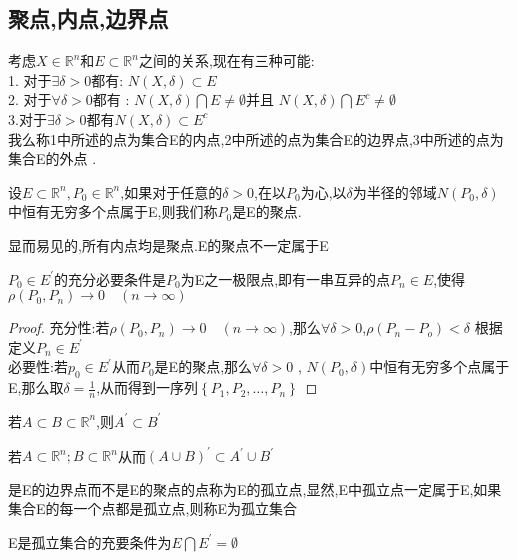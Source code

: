 \subsection{聚点,内点,边界点}
考虑\(X \in \mathbb{R}^{n}\)和\(E \subset \mathbb{R}^n\)之间的关系,现在有三种可能: \\ 
1. 对于\(\exists \delta > 0 \)都有: \(N(X , \delta) \subset E\) \\ 
2. 对于\(\forall \delta > 0\)都有 : \(N(X ,\delta) \bigcap E \neq \emptyset\)并且 \(N(X, \delta) \bigcap E^{c} \neq \emptyset\) \\
3.对于\(\exists \delta > 0 \)都有\(N(X,\delta) \subset E^{c}\) \\
我么称1中所述的点为集合E的内点,2中所述的点为集合E的边界点,3中所述的点为集合E的外点 . 
\begin{Definition}
    设\(E \subset \mathbb{R}^{n} , P_0 \in \mathbb{R}^n\),如果对于任意的\(\delta > 0\),在以\(P_0\)为心,以\(\delta\)为半径的邻域\(N (P_0 , \delta)\)中恒有无穷多个点属于E,则我们称\(P_0\)是E的聚点.
\end{Definition}
显而易见的,所有内点均是聚点.E的聚点不一定属于E
\begin{Theorem}
    \(P_0 \in E^{'}\)的充分必要条件是\(P_0\)为E之一极限点,即有一串互异的点\(P_n \in E\),使得\(\rho (P_0 , P_n) \rightarrow 0 \quad(n \rightarrow \infty )\)
\end{Theorem}
\begin{proof}
    充分性:若\(\rho (P_0 , P_n) \rightarrow 0 \quad(n \rightarrow \infty )\),那么\(\forall \delta > 0 \),\(\rho(P_n - P_o) < \delta\) 根据定义\(P_n \in E^{'}\)
    \\ 
    必要性:若\(p_0 \in E^{'}\)从而\(P_0\)是E的聚点,那么\(\forall \delta > 0 \) , \(N(P_0 , \delta ) \)中恒有无穷多个点属于E,那么取\(\delta = \frac{1}{n}\),从而得到一序列\(\left\{P_1,P_2,\dots,P_n\right\}\)
\end{proof}
\begin{Theorem}
    若\(A \subset B \subset \mathbb{R}^n\),则\(A^{'} \subset B^{'}\)
\end{Theorem}
\begin{Theorem}
    若\(A \subset \mathbb{R}^{n}  ; B \subset \mathbb{R}^n \)从而\((A \cup B)^{'} \subset A^{'} \cup B^{'}\)
\end{Theorem}
是E的边界点而不是E的聚点的点称为E的孤立点,显然,E中孤立点一定属于E,如果集合E的每一个点都是孤立点,则称E为孤立集合
\begin{Theorem}
    E是孤立集合的充要条件为\(E \bigcap E^{'} = \emptyset\)
\end{Theorem}
